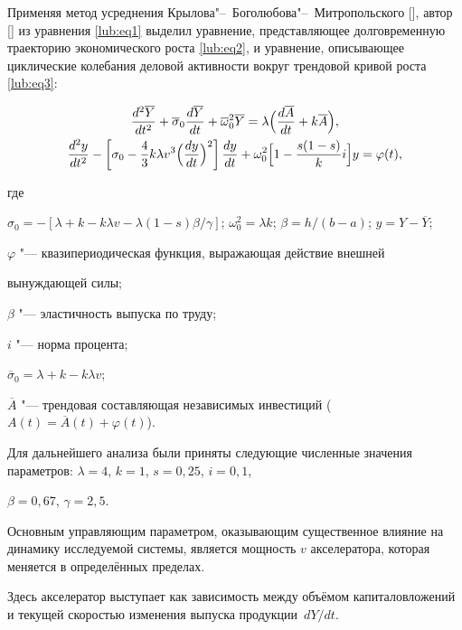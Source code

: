 Применяя метод усреднения Крылова"--~Боголюбова"--~Митропольского [], автор [] из уравнения \eqref{lub:eq1} выделил уравнение, представляющее долговременную траекторию экономического роста \eqref{lub:eq2}, и уравнение, описывающее циклические колебания деловой активности вокруг трендовой кривой роста \eqref{lub:eq3}:

\begin{gather}

\label{lub:eq2}

\frac{d^2\overline Y }{dt^2}+\overline \sigma _0 \frac{d\overline Y }{dt}+\overline \omega _0^2 \overline Y =\lambda \Bigl( \frac{d\overline A }{dt}+k\overline {A} \Bigr),

\\

\label{lub:eq3}

\frac{d^2y}{dt^2}-\left[ \sigma _0 -\frac{4}{3}k\lambda v ^3\Bigl( \frac{dy}{dt} \Bigr)^2 \right]\frac{dy}{dt}+\omega _0^2 \Bigl[ 1-\frac{s(1-s)}{k}i \Bigr]y=\varphi (t),

\end{gather}

где 

$\sigma _0 =-[ \lambda +k-k\lambda v -{\lambda (1-s)\beta }/{\gamma }]$; $\omega _0^2 =\lambda k$; $\beta 

={h}/({b-a})$; $y=Y-\overline Y $;

$\varphi $ "--- квазипериодическая функция, выражающая действие внешней 

вынуждающей силы;

$\beta $ "--- эластичность выпуска по труду; 

$i$ "--- норма процента; 

$\overline \sigma _0 =\lambda +k-k\lambda v$;

$\overline A $ "--- трендовая составляющая независимых инвестиций ($A(t)=\overline {A}(t)+\varphi (t )$).

Для дальнейшего анализа были приняты следующие  численные значения параметров: $\lambda =4$, $k=1$, $s=0,25$, $i=0,1$, 

$\beta =0,67$, $\gamma =2,5.$



Основным управляющим параметром, оказывающим существенное влияние на динамику исследуемой системы, является мощность $v $ акселератора, которая  меняется в определённых пределах. 

Здесь акселератор выступает как  зависимость между объёмом капиталовложений и текущей скоростью изменения выпуска продукции~${dY}/{dt}$.



